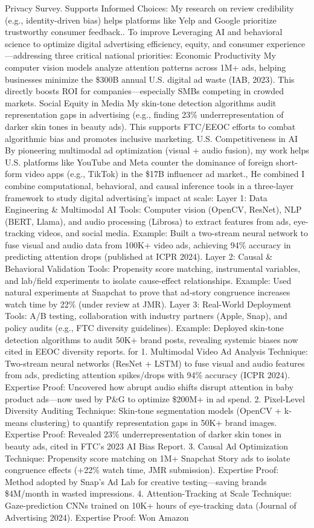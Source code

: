 \documentclass{article}
\begin{document}
Privacy Survey.  Supports Informed Choices: My research on review credibility (e.g., identity-driven bias) helps platforms like Yelp and Google prioritize trustworthy consumer feedback.. To improve Leveraging AI and behavioral science to optimize digital advertising efficiency, equity, and consumer experience—addressing three critical national priorities:  Economic Productivity  My computer vision models analyze attention patterns across 1M+ ads, helping businesses minimize the \$300B annual U.S. digital ad waste (IAB, 2023). This directly boosts ROI for companies—especially SMBs competing in crowded markets.  Social Equity in Media  My skin-tone detection algorithms audit representation gaps in advertising (e.g., finding 23\% underrepresentation of darker skin tones in beauty ads). This supports FTC/EEOC efforts to combat algorithmic bias and promotes inclusive marketing.  U.S. Competitiveness in AI  By pioneering multimodal ad optimization (visual + audio fusion), my work helps U.S. platforms like YouTube and Meta counter the dominance of foreign short-form video apps (e.g., TikTok) in the \$17B influencer ad market., He combined I combine computational, behavioral, and causal inference tools in a three-layer framework to study digital advertising’s impact at scale:  Layer 1: Data Engineering \& Multimodal AI  Tools: Computer vision (OpenCV, ResNet), NLP (BERT, Llama), and audio processing (Librosa) to extract features from ads, eye-tracking videos, and social media.  Example: Built a two-stream neural network to fuse visual and audio data from 100K+ video ads, achieving 94\% accuracy in predicting attention drops (published at ICPR 2024).  Layer 2: Causal \& Behavioral Validation  Tools: Propensity score matching, instrumental variables, and lab/field experiments to isolate cause-effect relationships.  Example: Used natural experiments at Snapchat to prove that ad-story congruence increases watch time by 22\% (under review at JMR).  Layer 3: Real-World Deployment  Tools: A/B testing, collaboration with industry partners (Apple, Snap), and policy audits (e.g., FTC diversity guidelines).  Example: Deployed skin-tone detection algorithms to audit 50K+ brand posts, revealing systemic biases now cited in EEOC diversity reports. for 1. Multimodal Video Ad Analysis  Technique: Two-stream neural networks (ResNet + LSTM) to fuse visual and audio features from ads, predicting attention spikes/drops with 94\% accuracy (ICPR 2024).  Expertise Proof: Uncovered how abrupt audio shifts disrupt attention in baby product ads—now used by P\&G to optimize \$200M+ in ad spend.  2. Pixel-Level Diversity Auditing  Technique: Skin-tone segmentation models (OpenCV + k-means clustering) to quantify representation gaps in 50K+ brand images.  Expertise Proof: Revealed 23\% underrepresentation of darker skin tones in beauty ads, cited in FTC’s 2023 AI Bias Report.  3. Causal Ad Optimization  Technique: Propensity score matching on 1M+ Snapchat Story ads to isolate congruence effects (+22\% watch time, JMR submission).  Expertise Proof: Method adopted by Snap’s Ad Lab for creative testing—saving brands \$4M/month in wasted impressions.  4. Attention-Tracking at Scale  Technique: Gaze-prediction CNNs trained on 10K+ hours of eye-tracking data (Journal of Advertising 2024).  Expertise Proof: Won Amazon 
\end{document}
